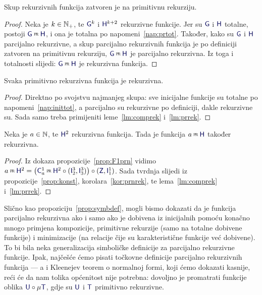 \begin{lema}\label{lm:prrek}
Skup rekurzivnih funkcija zatvoren je na primitivnu rekurziju.
\end{lema}
\begin{proof}
Neka je $k\in{\mathbb N}_+$, te $\f G^k$ i $\f H^{k+2}$ rekurzivne funkcije. Jer su $\f G$ i $\f H$ totalne, postoji $\f G\pr\f H$, i ona je totalna po napomeni~\ref{nap:prtot}. Također, kako su $\f G$ i $\f H$ parcijalno rekurzivne, a skup parcijalno rekurzivnih funkcija je po definiciji zatvoren na primitivnu rekurziju, $\f G\pr\f H$ je parcijalno rekurzivna. Iz toga i totalnosti slijedi: $\f G\pr\f H$ je rekurzivna funkcija.
\end{proof}

\begin{korolar}\label{kor:prnrek}
Svaka primitivno rekurzivna funkcija je rekurzivna.
\end{korolar}
\begin{proof}
Direktno po svojstvu najmanjeg skupa: sve inicijalne funkcije su totalne po napomeni~\ref{nap:inittot}, a parcijalno su rekurzivne po definiciji, dakle rekurzivne su. Sada samo treba primijeniti leme~\ref{lm:comprek} i~\ref{lm:prrek}.
\end{proof}

\begin{korolar}\label{kor:F1rek}
Neka je $a\in{\mathbb N}$, te $\f H^2$ rekurzivna funkcija. Tada je funkcija $a\pr\f H$ također rekurzivna.
\end{korolar}
\begin{proof}
Iz dokaza propozicije~\ref{prop:F1prn}
vidimo $a\pr\f H^2=\bigl(\f C_a^1\pr\f H^2\circ(\f I_2^3,\f I_3^3)\bigr)\circ(\f Z,\f I_1^1)$. Sada tvrdnja slijedi iz propozicije~\ref{prop:konst}, korolara~\ref{kor:prnrek}, te lema~\ref{lm:comprek} i~\ref{lm:prrek}.
\end{proof}

Slično kao propoziciju~\ref{prop:symbdef}, mogli bismo dokazati da je funkcija parcijalno rekurzivna ako i samo ako je dobivena iz inicijalnih pomoću konačno mnogo primjena kompozicije, primitivne rekurzije (samo na totalne dobivene funkcije) i minimizacije (na relacije čije su karakteristične funkcije već dobivene). To bi bila neka generalizacija simboličke definicije za parcijalno rekurzivne funkcije. Ipak, najčešće ćemo pisati točkovne definicije parcijalno rekurzivnih funkcija --- a i Kleenejev teorem o normalnoj formi, koji ćemo dokazati kasnije, reći će da nam tolika općenitost nije potrebna: dovoljno je promatrati funkcije oblika $\f U\circ\mu\f T$, gdje su $\f U$ i $\f T$ primitivno rekurzivne.

